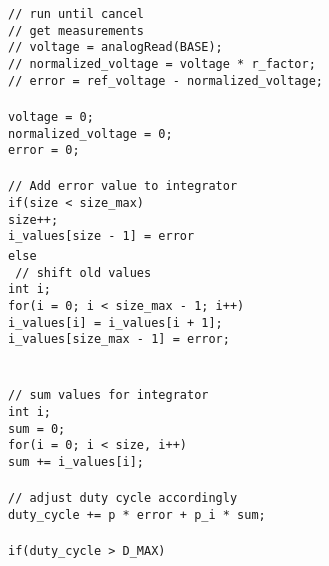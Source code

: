 \documentclass[a4paper, 12pt]{article}
\begin{document}
\begin{appendices}
{{	\texttt{// run until cancel} \\\noindent
	\texttt{// get measurements} \\\noindent
	\texttt{// voltage = analogRead(BASE);} \\\noindent
	\texttt{// normalized\_voltage = voltage * r\_factor;} \\\noindent
	\texttt{// error = ref\_voltage - normalized\_voltage;} \\\noindent
	\texttt{ \\\noindent}
	\texttt{voltage = 0;} \\\noindent
	\texttt{normalized\_voltage = 0;} \\\noindent
	\texttt{error = 0;} \\\noindent
	\texttt{ \\\noindent}
	\texttt{// Add error value to integrator} \\\noindent
	\texttt{if(size < size\_max)} \\\noindent
	\texttt{size++;} \\\noindent
	\texttt{i\_values[size - 1] = error} \\\noindent
	\texttt{else { \\\noindent}
	\texttt{// shift old values} \\\noindent
	\texttt{int i;} \\\noindent
	\texttt{for(i = 0; i < size\_max - 1; i++)} \\\noindent
	\texttt{i\_values[i] = i\_values[i + 1];} \\\noindent
	\texttt{i\_values[size\_max - 1] = error;} \\\noindent
	\texttt{}} \\\noindent
	\texttt{ \\\noindent}
	\texttt{// sum values for integrator} \\\noindent
	\texttt{int i;} \\\noindent
	\texttt{sum = 0;} \\\noindent
	\texttt{for(i = 0; i < size, i++)} \\\noindent
	\texttt{sum += i\_values[i];} \\\noindent
	\texttt{ \\\noindent}
	\texttt{// adjust duty cycle accordingly} \\\noindent
	\texttt{duty\_cycle += p * error + p\_i * sum;} \\\noindent
	\texttt{ \\\noindent}
	\texttt{if(duty\_cycle > D\_MAX)} \\\noindent
}}
\end{appendices}
\end{document}
